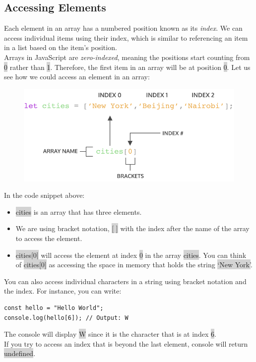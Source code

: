 \documentclass[11pt]{article}
\begin{document}
\subsection{Accessing Elements}
Each element in an array has a numbered position known as its \textit{index}. We can access individual items using their index, which is similar to referencing an item in a list based on the item’s position. \\
\newline
Arrays in JavaScript are \textit{zero-indexed}, meaning the positions start counting from \colorbox{lightgray}{0} rather than \colorbox{lightgray}{1}. Therefore, the first item in an array will be at position \colorbox{lightgray}{0}. Let us see how we could access an element in an array:
\begin{figure}[H]
\includegraphics[scale = 0.65]{6_2}
\centering
\end{figure}
In the code snippet above:
\begin{itemize}[leftmargin = *]
\item \colorbox{lightgray}{cities} is an array that has three elements.
\item We are using bracket notation, \colorbox{lightgray}{$[$ $]$} with the index after the name of the array to access the element.
\item \colorbox{lightgray}{cities[0]} will access the element at index \colorbox{lightgray}{0} in the array \colorbox{lightgray}{cities}. You can think of \colorbox{lightgray}{cities[0]} as accessing the space in memory that holds the string \colorbox{lightgray}{`New York'}.
\end{itemize}
You can also access individual characters in a string using bracket notation and the index. For instance, you can write:
\begin{lstlisting}
const hello = "Hello World";
console.log(hello[6]); // Output: W
\end{lstlisting}
The console will display \colorbox{lightgray}{W} since it is the character that is at index \colorbox{lightgray}{6}.\\
\newline
If you try to access an index that is beyond the last element, console will return \colorbox{lightgray}{undefined}. 
\end{document}
